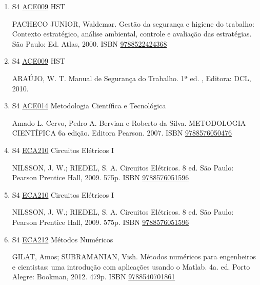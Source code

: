 \documentclass[12pt,a4paper]{book}
\begin{document}
\begin{enumerate}
 
 \item S4 \hyperref[PUD:ACE009]{ACE009} HST

  PACHECO JUNIOR, Waldemar.  Gestão da segurança e higiene do trabalho: Contexto estratégico, análise ambiental, controle e avaliação das estratégias.  São Paulo: Ed.  Atlas, 2000.  ISBN \href{http://www.bn.br/site/pages/servicosProfissionais/agenciaISBN/isbnBusca/FbnBuscaISBNCatalogo.asp?pField=ISBN&pIntPagina=1&pISBN=22424368&nidbISBN=true&hidbISBN=true}{9788522424368}
 
 
 \item S4 \hyperref[PUD:ACE009]{ACE009} HST

  ARAÚJO,  W.  T.  Manual de Segurança do Trabalho.  1ª ed. , Editora: DCL, 2010.
 \item S4 \hyperref[PUD:ACE014]{ACE014} Metodologia Científica e Tecnológica

  Amado L.  Cervo, Pedro A.  Bervian e Roberto da Silva.  
METODOLOGIA CIENTÍFICA 6a edição.  Editora Pearson.  2007.  ISBN \href{http://www.bn.br/site/pages/servicosProfissionais/agenciaISBN/isbnBusca/FbnBuscaISBNCatalogo.asp?pField=ISBN&pIntPagina=1&pISBN=76050476&nidbISBN=true&hidbISBN=true}{9788576050476}
 
 
 \item S4 \hyperref[PUD:ECA210]{ECA210} Circuitos Elétricos I

 NILSSON, J.  W.;  RIEDEL, S.  A.  Circuitos Elétricos.  8 ed.  São Paulo: Pearson 
Prentice Hall, 2009.  575p.  ISBN \href{http://www.bn.br/site/pages/servicosProfissionais/agenciaISBN/isbnBusca/FbnBuscaISBNCatalogo.asp?pField=ISBN&pIntPagina=1&pISBN=76051596&nidbISBN=true&hidbISBN=true}{9788576051596}
 
 
 \item S4 \hyperref[PUD:ECA210]{ECA210} Circuitos Elétricos I

 NILSSON, J.  W.;  RIEDEL, S.  A.  Circuitos Elétricos.  8 ed.  São Paulo: Pearson 
Prentice Hall, 2009.  575p.  ISBN \href{http://www.bn.br/site/pages/servicosProfissionais/agenciaISBN/isbnBusca/FbnBuscaISBNCatalogo.asp?pField=ISBN&pIntPagina=1&pISBN=76051596&nidbISBN=true&hidbISBN=true}{9788576051596}
 
 
 \item S4 \hyperref[PUD:ECA212]{ECA212} Métodos Numéricos

 GILAT, Amos;  SUBRAMANIAN, Vish.  Métodos numéricos para engenheiros e cientistas: uma introdução com aplicações usando o Matlab.  4a.  ed.  Porto Alegre: Bookman, 2012.  479p.  ISBN \href{http://www.bn.br/site/pages/servicosProfissionais/agenciaISBN/isbnBusca/FbnBuscaISBNCatalogo.asp?pField=ISBN&pIntPagina=1&pISBN=40701861&nidbISBN=true&hidbISBN=true}{9788540701861}
 

\end{enumerate}
\end{document}
